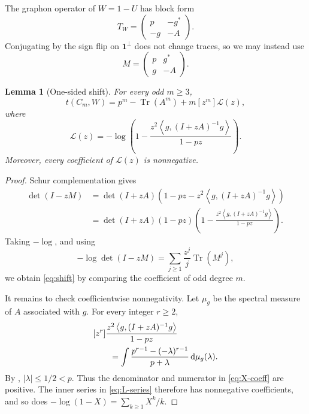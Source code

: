 \documentclass[11pt]{article}
\newtheorem{lemma}[theorem]{Lemma}
\newcommand{\one}{\mathbf 1}
\newcommand{\ip}[2]{\left\langle #1,#2\right\rangle}
\newcommand{\Tr}{\operatorname{Tr}}
\newcommand{\cL}{\mathcal L}
\newcommand{\dd}{\,\mathrm d}
\begin{document}
The graphon operator of \(W=1-U\) has block form
\[
       T_W=
       \begin{pmatrix}
          p&-g^*\\
          -g&-A
       \end{pmatrix}.
\]
Conjugating by the sign flip on \(\one^\perp\) does not change traces, so we
may instead use
\[
       M=
       \begin{pmatrix}
          p&g^*\\
          g&-A
       \end{pmatrix}.
\]

\begin{lemma}[One-sided shift]\label{lem:shift}
For every odd \(m\ge3\),
\begin{equation}\label{eq:shift}
 t(C_m,W)=p^m-\Tr(A^m)+m[z^m]\cL(z),
\end{equation}
where
\begin{equation}\label{eq:L-series}
 \cL(z)=-\log\left(
 1-\frac{z^2\ip g{(I+zA)^{-1}g}}{1-pz}
 \right).
\end{equation}
Moreover, every coefficient of \(\cL(z)\) is nonnegative.
\end{lemma}

\begin{proof}
Schur complementation gives
\begin{align*}
 \det(I-zM)
 &=\det(I+zA)
   \left(1-pz-z^2\ip g{(I+zA)^{-1}g}\right)\\
 &=\det(I+zA)(1-pz)
   \left(1-\frac{z^2\ip g{(I+zA)^{-1}g}}{1-pz}\right).
\end{align*}
Taking \(-\log\), and using
\[
 -\log\det(I-zM)=\sum_{j\ge1}\frac{z^j}{j}\Tr(M^j),
\]
we obtain \eqref{eq:shift} by comparing the coefficient of odd degree
\(m\).

It remains to check coefficientwise nonnegativity.  Let \(\mu_g\) be the
spectral measure of \(A\) associated with \(g\).  For every integer
\(r\ge2\),
\begin{align}
 &[z^r]\frac{z^2\ip g{(I+zA)^{-1}g}}{1-pz}\notag\\
 &\qquad=\int
 \frac{p^{r-1}-(-\lambda)^{r-1}}{p+\lambda}\dd\mu_g(\lambda).
 \label{eq:X-coeff}
\end{align}
By , \(|\lambda|\le1/2<p\).  Thus the denominator and
numerator in \eqref{eq:X-coeff} are positive.  The inner series in
\eqref{eq:L-series} therefore has nonnegative coefficients, and so does
\(-\log(1-X)=\sum_{k\ge1}X^k/k\).
\end{proof}
\end{document}
